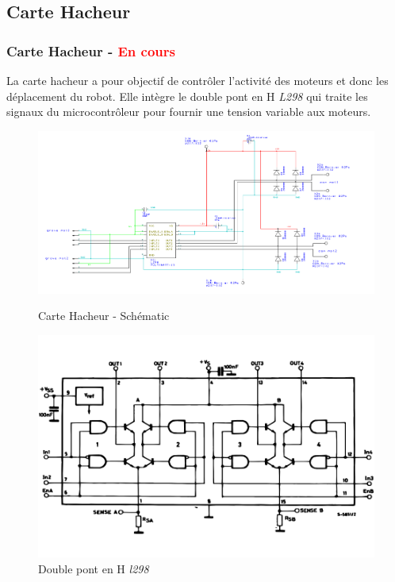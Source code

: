 \subsection{Carte Hacheur}
\begin{frame}
    \frametitle{Carte Hacheur - \textcolor{red}{En cours}}
    La carte hacheur a pour objectif de contrôler l'activité des moteurs et donc les déplacement du robot. Elle intègre le double pont en H \emph{L298} qui traite les signaux du microcontrôleur pour fournir une tension variable aux moteurs.
    \begin{figure}[H]
        \centering
        \begin{minipage}{.5\textwidth}
            \centering
            \includegraphics[width=.7\linewidth]{Images/carteHacheur_sch.png}
            \caption{Carte Hacheur - Schématic}
            \label{fig:hacheursch}
        \end{minipage}%
        \begin{minipage}{.5\textwidth}
            \centering
            \includegraphics[width=.7\linewidth]{Images/l298.png}
            \caption{Double pont en H \emph{l298}}
            \label{fig:l298}
        \end{minipage}%
    \end{figure}

\footer{\hfill\insertframenumber/\inserttotalframenumber}
\end{frame}

